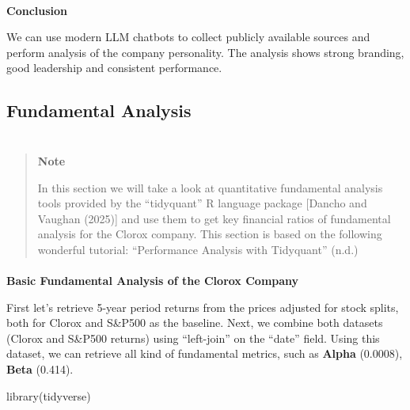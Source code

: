 \documentclass[
  letterpaper,
  DIV=11,
  numbers=noendperiod]{scrartcl}
\makeatletter
\let\oldparagraph\paragraph
\renewcommand{\paragraph}{
    \@ifstar
      \xxxParagraphStar
      \xxxParagraphNoStar
  }
\newcommand{\xxxParagraphStar}[1]{\oldparagraph*{#1}\mbox{}}
\newcommand{\xxxParagraphNoStar}[1]{\oldparagraph{#1}\mbox{}}
\newenvironment{Shaded}{\begin{snugshade}}{\end{snugshade}}
\newcommand{\NormalTok}[1]{\textcolor[rgb]{0.00,0.23,0.31}{#1}}
\makeatother
\begin{document}
\paragraph{\texorpdfstring{\textbf{Conclusion}}{Conclusion}}\label{conclusion-1}

We can use modern LLM chatbots to collect publicly available sources and
perform analysis of the company personality. The analysis shows strong
branding, good leadership and consistent performance.

\subsection{Fundamental Analysis}\label{fundamental-analysis}

\section{}\label{section-3}

\begin{quote}
\textbf{Note}

In this section we will take a look at quantitative fundamental analysis
tools provided by the ``tidyquant'' R language package {[}Dancho and
Vaughan (2025){]} and use them to get key financial ratios of
fundamental analysis for the Clorox company. This section is based on
the following wonderful tutorial: {``Performance {Analysis} with
Tidyquant''} (n.d.)
\end{quote}

\paragraph{\texorpdfstring{\textbf{Basic Fundamental Analysis of the
Clorox
Company}}{Basic Fundamental Analysis of the Clorox Company}}\label{basic-fundamental-analysis-of-the-clorox-company}

First let's retrieve 5-year period returns from the prices adjusted for
stock splits, both for Clorox and S\&P500 as the baseline. Next, we
combine both datasets (Clorox and S\&P500 returns) using ``left-join''
on the ``date'' field. Using this dataset, we can retrieve all kind of
fundamental metrics, such as \textbf{Alpha} (0.0008), \textbf{Beta}
(0.414).

\begin{Shaded}
\begin{Highlighting}[]
\NormalTok{library(tidyverse)}
\end{Highlighting}
\end{Shaded}
\end{document}
